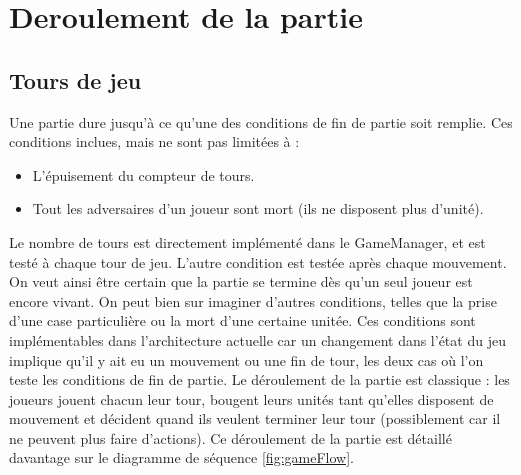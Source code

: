 \section{Deroulement de la partie}
\subsection{Tours de jeu}
Une partie dure jusqu'à ce qu'une des conditions de fin de partie soit remplie.
Ces conditions inclues, mais ne sont pas limitées à :
\begin{itemize}
  \item L'épuisement du compteur de tours.
  \item Tout les adversaires d'un joueur sont mort (ils ne disposent plus d'unité).
\end{itemize}
Le nombre de tours est directement implémenté dans le GameManager, et est testé à chaque tour de jeu.
L'autre condition est testée après chaque mouvement. On veut ainsi être certain que la partie se termine dès qu'un seul joueur est encore vivant.
On peut bien sur imaginer d'autres conditions, telles que la prise d'une case particulière ou la mort d'une certaine unitée.
Ces conditions sont implémentables dans l'architecture actuelle car un changement dans l'état du jeu implique qu'il y ait eu un mouvement ou une fin de tour, les deux cas où l'on teste les conditions de fin de partie.
\newline
Le déroulement de la partie est classique : les joueurs jouent chacun leur tour, bougent leurs unités tant qu'elles disposent de mouvement et décident quand ils veulent terminer leur tour (possiblement car il ne peuvent plus faire d'actions).
Ce déroulement de la partie est détaillé davantage sur le diagramme de séquence \ref{fig:gameFlow}.
